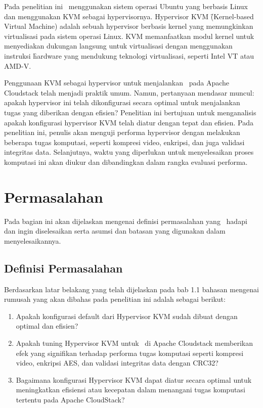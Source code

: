 Pada penelitian ini \saya\ menggunakan sistem operasi Ubuntu yang berbasis Linux dan menggunakan KVM sebagai hypervisornya. Hypervisor KVM \f{(Kernel-based Virtual Machine)} adalah sebuah hypervisor berbasis kernel yang memungkinkan virtualisasi pada sistem operasi Linux\cite{whatiskvm}. KVM memanfaatkan modul kernel untuk menyediakan dukungan langsung untuk virtualisasi dengan menggunakan instruksi \f{hardware} yang mendukung teknologi virtualisasi, seperti Intel VT atau AMD-V.

Penggunaan KVM sebagai hypervisor untuk menjalankan \vm\ pada Apache Cloudstack telah menjadi praktik umum. Namun, pertanyaan mendasar muncul: apakah hypervisor ini telah dikonfigurasi secara optimal untuk menjalankan tugas yang diberikan dengan efisien? Penelitian ini bertujuan untuk menganalisis apakah konfigurasi hypervisor KVM telah diatur dengan tepat dan efisien. Pada penelitian ini, penulis akan menguji performa hypervisor dengan melakukan beberapa tugas komputasi, seperti kompresi video, enkripsi, dan juga validasi integritas data. Selanjutnya, waktu yang diperlukan untuk menyelesaikan proses komputasi ini akan diukur dan dibandingkan dalam rangka evaluasi performa.


\section{Permasalahan}
Pada bagian ini akan dijelaskan mengenai definisi permasalahan yang \saya\ hadapi dan ingin diselesaikan serta asumsi dan batasan yang digunakan dalam menyelesaikannya.


\subsection{Definisi Permasalahan}
Berdasarkan latar belakang yang telah dijelaskan pada bab 1.1 bahasan mengenai rumusah yang akan dibahas pada penelitian ini adalah sebagai berikut:
\begin{enumerate}
  \item Apakah konfigurasi default dari Hypervisor KVM sudah dibuat dengan optimal dan efisien?
  \item Apakah tuning Hypervisor KVM untuk \vm\ di Apache Cloudstack memberikan efek yang signifikan terhadap performa tugas komputasi seperti kompresi video, enkripsi AES, dan validasi integritas data dengan CRC32?
  \item Bagaimana konfigurasi Hypervisor KVM dapat diatur secara optimal untuk meningkatkan efisiensi atau kecepatan dalam menangani tugas komputasi tertentu pada Apache CloudStack?
  
\end{enumerate}

